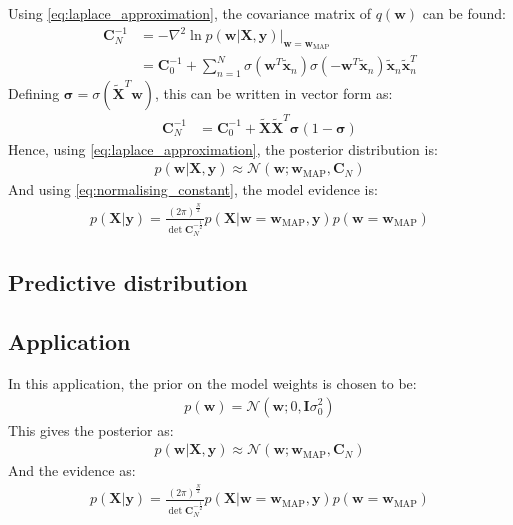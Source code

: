 \documentclass[a4paper]{article}
\begin{document}
    Using \autoref{eq:laplace_approximation}, the covariance matrix of $q(\bm{w})$ can be found:
    \begin{align}
        \bm{C}_N^{-1} &= -\nabla^2 \ln p(\bm{w} | \bm{X}, \bm{y}) \big|_{\bm{w} =\bm{w}_{\text{MAP}}} \nonumber \\
        &= \bm{C}_0^{-1}
        + \sum_{n=1}^N \sigma(\bm{w}^T \tilde{\bm{x}}_n) \sigma(-\bm{w}^T \tilde{\bm{x}}_n)\tilde{\bm{x}}_n\tilde{\bm{x}}_n^T
    \end{align}
    Defining $\bm{\sigma} = \sigma(\tilde{\bm{X}}^T \bm{w})$, this can be written in vector form as:
    \begin{align}
         \bm{C}_N^{-1} &= \bm{C}_0^{-1} + \tilde{\bm{X}}\tilde{\bm{X}}^T \bm{\sigma} (1 - \bm{\sigma})
    \end{align}
    Hence, using \autoref{eq:laplace_approximation}, the posterior distribution is:
    \begin{align}
        p(\bm{w} | \bm{X}, \bm{y}) \approx \mathcal{N}(\bm{w}; \bm{w}_\text{MAP}, \bm{C}_N)
    \end{align}
    And using \autoref{eq:normalising_constant}, the model evidence is:
    \begin{align}
        p(\bm{X} | \bm{y}) = \frac{(2\pi)^\frac{N}{2}}{\det \bm{C}_N^{-\frac{1}{2}}}
                            p(\bm{X} | \bm{w} = \bm{w}_\text{MAP}, \bm{y}) p(\bm{w} = \bm{w}_\text{MAP})
    \end{align}

    \subsection{Predictive distribution}

    \subsection{Application}
    In this application, the prior on the model weights is chosen to be:
    \begin{align}
        p(\bm{w}) = \mathcal{N}(\bm{w}; 0, \bm{I}\sigma_0^2)
    \end{align}
    This gives the posterior as:
    \begin{align}
        p(\bm{w} | \bm{X}, \bm{y}) \approx \mathcal{N}(\bm{w}; \bm{w}_\text{MAP}, \bm{C}_N)
    \end{align}
    And the evidence as:
    \begin{align}
        p(\bm{X} | \bm{y}) = \frac{(2\pi)^\frac{N}{2}}{\det \bm{C}_N^{-\frac{1}{2}}}
                            p(\bm{X} | \bm{w} = \bm{w}_\text{MAP}, \bm{y}) p(\bm{w} = \bm{w}_\text{MAP})
    \end{align}
\end{document}
